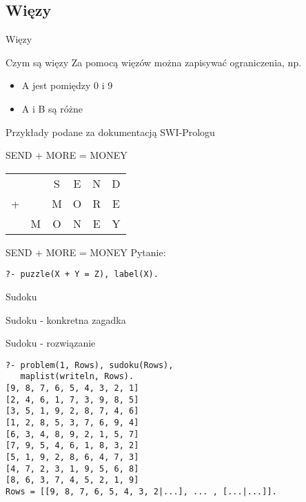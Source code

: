 \documentclass[blue]{beamer}
\newcommand{\tytul}[1]{\begin{frame}\begin{center}\begin{Huge}#1\end{Huge}\end{center}\end{frame}}
\begin{document}
\subsection{Więzy}
\tytul{Więzy}
\begin{frame}{Czym są więzy}
Za pomocą więzów można zapisywać ograniczenia, np.
\begin{itemize}
\item A jest pomiędzy 0 i 9
\item A i B są różne
\end{itemize}

Przykłady podane za dokumentacją SWI-Prologu
\end{frame}
\begin{frame}{SEND + MORE = MONEY}
\begin{center}
\begin{Huge}
\begin{tabular}{cccccc}
 &  & S & E & N & D \\ 
+ &  & M & O & R & E \\ 
\hline 
 & M & O & N & E & Y \\ 
\end{tabular}
\end{Huge} 
\end{center}
\end{frame}
\begin{frame}[fragile]{SEND + MORE = MONEY}
Pytanie:
\begin{lstlisting}
?- puzzle(X + Y = Z), label(X).
\end{lstlisting}

\end{frame}
\begin{frame}{Sudoku}

\end{frame}
\begin{frame}{Sudoku - konkretna zagadka}

\end{frame}
\begin{frame}[fragile]{Sudoku - rozwiązanie}
\begin{lstlisting}
?- problem(1, Rows), sudoku(Rows),
   maplist(writeln, Rows).
[9, 8, 7, 6, 5, 4, 3, 2, 1]
[2, 4, 6, 1, 7, 3, 9, 8, 5]
[3, 5, 1, 9, 2, 8, 7, 4, 6]
[1, 2, 8, 5, 3, 7, 6, 9, 4]
[6, 3, 4, 8, 9, 2, 1, 5, 7]
[7, 9, 5, 4, 6, 1, 8, 3, 2]
[5, 1, 9, 2, 8, 6, 4, 7, 3]
[4, 7, 2, 3, 1, 9, 5, 6, 8]
[8, 6, 3, 7, 4, 5, 2, 1, 9]
Rows = [[9, 8, 7, 6, 5, 4, 3, 2|...], ... , [...|...]].
\end{lstlisting}
\end{frame}
\end{document}
